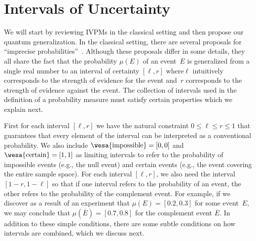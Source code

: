 \documentclass[english,reprint, aps, prl,superscriptaddress, showpacs,
showkeys, longbibliography, amsmath, amssymb]{revtex4-1}
\theoremstyle{plain}
\theoremstyle{definition}
\newcommand{\imposs}{{\text{\wesa{impossible}}}}
\newcommand{\necess}{{\text{\wesa{certain}}}}
\newcommand{\nb}{\nolinebreak[1] }
\begin{document}
\section{Intervals of Uncertainty}
  \label{sec:Interval-Uncertainty}
We will start by reviewing IVPMs in the classical setting and then
propose our quantum generalization. In the classical setting, there
are several proposals for ``imprecise
probabilities''~\citep{Dempster1967,Shafer1976,GilboaSchmeidler1994,Weichselberger2000,JamisonLodwick2004,HuberRonchetti2009,Grabisch2016}.
Although these proposals differ in some details, they all share the
fact that the probability $\mu(E)$ of an event~$E$ is generalized from
a single real number to an interval of certainty $[\ell,r]$
where\nb$\ell$ intuitively corresponds to the strength of evidence for
the event and~$r$ corresponds to the strength of evidence against the
event. The collection of intervals used in the definition of a
probability measure must satisfy certain properties which we explain
next.

First for each interval $[\ell,r]$ we have the natural constraint
$0 \leq \ell \leq r \leq 1$ that guarantees that every element of the
interval can be interpreted as a conventional probability. We also
include $\imposs=[0,0]$ and $\necess=[1,1]$ as limiting intervals to
refer to the probability of impossible events (e.g., the null event)
and certain events (e.g., the event covering the entire sample space).
For each interval $[\ell,r]$, we also need the interval
$[1-r,1-\ell]$ so that if one interval refers to the probability of an
event, the other refers to the probability of the complement
event. For example, if we discover as a result of an experiment that
$\mu(E) = [0.2,0.3]$ for some event~$E$, we may conclude that
$\mu(\overline{E}) = [0.7,0.8]$ for the complement event
$\overline{E}$. In addition to these simple conditions, there are some
subtle conditions on how intervals are combined, which we discuss
next.
\end{document}
